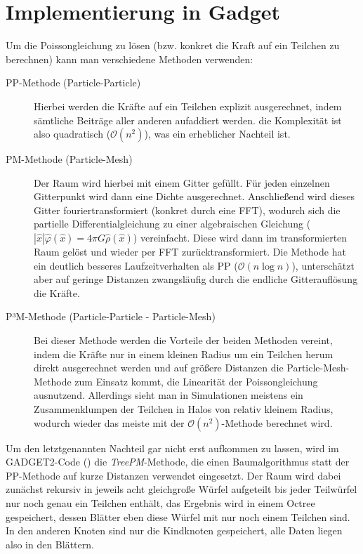 \documentclass[a4paper]{scrartcl}
\begin{document}
\section{Implementierung in Gadget}
Um die Poissongleichung zu lösen (bzw. konkret die Kraft auf ein Teilchen zu
berechnen) kann man verschiedene Methoden verwenden:
\begin{description}
  \item[PP-Methode (Particle-Particle)]
    Hierbei werden die Kräfte auf ein Teilchen explizit ausgerechnet, indem
    sämtliche Beiträge aller anderen aufaddiert werden. die Komplexität ist also
    quadratisch ($\mathcal O(n^2)$), was ein erheblicher Nachteil ist.
  \item[PM-Methode (Particle-Mesh)]
    Der Raum wird hierbei mit einem Gitter gefüllt. Für jeden einzelnen
    Gitterpunkt wird dann eine Dichte ausgerechnet. Anschließend wird dieses
    Gitter fouriertransformiert (konkret durch eine FFT), wodurch sich die
    partielle Differentialgleichung zu einer algebraischen Gleichung
    ($\left|\hat x\right| \hat \varphi(\hat x) = 4\pi G \hat \rho(\hat x)$)
    vereinfacht. Diese wird dann im transformierten Raum gelöst und wieder per
    FFT zurücktransformiert.  Die Methode hat ein deutlich besseres
    Laufzeitverhalten als PP ($\mathcal O(n\log n)$), unterschätzt aber auf
    geringe Distanzen zwangsläufig durch die endliche Gitterauflösung die
    Kräfte.
  \item[P³M-Methode (Particle-Particle - Particle-Mesh)]
    Bei dieser Methode werden die Vorteile der beiden Methoden vereint, indem
    die Kräfte nur in einem kleinen Radius um ein Teilchen herum direkt
    ausgerechnet werden und auf größere Distanzen die Particle-Mesh-Methode zum
    Einsatz kommt, die Linearität der Poissongleichung ausnutzend. Allerdings
    sieht man in Simulationen meistens ein Zusammenklumpen der Teilchen in Halos
    von relativ kleinem Radius, wodurch wieder das meiste mit der $\mathcal O
    (n^2)$-Methode berechnet wird.
\end{description}

Um den letztgenannten Nachteil gar nicht erst aufkommen zu lassen, wird im
GADGET2-Code (\cite{gadget}) die \emph{TreePM}-Methode, die einen
Baumalgorithmus statt der PP-Methode auf kurze Distanzen verwendet eingesetzt.
Der Raum wird dabei zunächst rekursiv in jeweils acht gleichgroße Würfel
aufgeteilt bis jeder Teilwürfel nur noch genau ein Teilchen enthält, das
Ergebnis wird in einem Octree gespeichert, dessen Blätter eben diese Würfel mit
nur noch einem Teilchen sind. In den anderen Knoten sind nur die Kindknoten
gespeichert, alle Daten liegen also in den Blättern.
\end{document}
